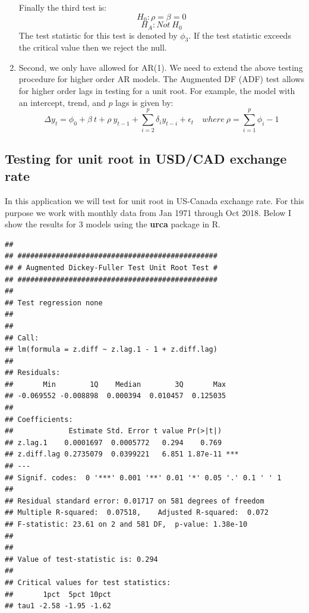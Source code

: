 \documentclass[]{book}
\theoremstyle{definition}
\theoremstyle{definition}
\theoremstyle{definition}
\theoremstyle{remark}
\begin{document}
\begin{enumerate}
  Finally the third test is:
  \[H_0: \rho=\beta=0 \]
  \[H_A: Not \ H_0\]
  The test statistic for this test is denoted by \(\phi_3\). If the test statistic exceeds the critical value then we reject the null.
\item
  Second, we only have allowed for AR(1). We need to extend the above testing procedure for higher order AR models. The Augmented DF (ADF) test allows for higher order lags in testing for a unit root. For example, the model with an intercept, trend, and \(p\) lags is given by:
  \[\Delta y_t= \phi_0 + \beta \ t+ \rho \ y_{t-1}+\sum_{i=2}^p\delta_i  y_{t-i}+\epsilon_t  \quad where \ \rho=\sum_{i=1}^p \phi_i-1\]
\end{enumerate}

\hypertarget{testing-for-unit-root-in-usdcad-exchange-rate}{%
\subsection{Testing for unit root in USD/CAD exchange rate}\label{testing-for-unit-root-in-usdcad-exchange-rate}}

In this application we will test for unit root in US-Canada exchange rate. For this purpose we work with monthly data from Jan 1971 through Oct 2018. Below I show the results for 3 models using the \textbf{urca} package in R.

\begin{verbatim}
## 
## ############################################### 
## # Augmented Dickey-Fuller Test Unit Root Test # 
## ############################################### 
## 
## Test regression none 
## 
## 
## Call:
## lm(formula = z.diff ~ z.lag.1 - 1 + z.diff.lag)
## 
## Residuals:
##       Min        1Q    Median        3Q       Max 
## -0.069552 -0.008898  0.000394  0.010457  0.125035 
## 
## Coefficients:
##             Estimate Std. Error t value Pr(>|t|)    
## z.lag.1    0.0001697  0.0005772   0.294    0.769    
## z.diff.lag 0.2735079  0.0399221   6.851 1.87e-11 ***
## ---
## Signif. codes:  0 '***' 0.001 '**' 0.01 '*' 0.05 '.' 0.1 ' ' 1
## 
## Residual standard error: 0.01717 on 581 degrees of freedom
## Multiple R-squared:  0.07518,    Adjusted R-squared:  0.072 
## F-statistic: 23.61 on 2 and 581 DF,  p-value: 1.38e-10
## 
## 
## Value of test-statistic is: 0.294 
## 
## Critical values for test statistics: 
##       1pct  5pct 10pct
## tau1 -2.58 -1.95 -1.62
\end{verbatim}
\end{document}
